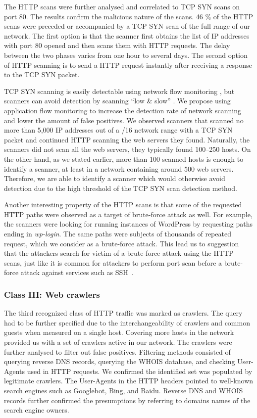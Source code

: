 The HTTP scans were further analysed and correlated to TCP SYN scans on port 80. The results confirm the malicious nature of the scans. 46 \% of the HTTP scans were preceded or accompanied by a TCP SYN scan of the full range of our network. The first option is that the scanner first obtains the list of IP addresses with port 80 opened and then scans them with HTTP requests. The delay between the two phases varies from one hour to several days. The second option of HTTP scanning is to send a HTTP request instantly after receiving a response to the TCP SYN packet.

TCP SYN scanning is easily detectable using network flow monitoring \cite{Sperotto-2010-Overview}, but scanners can avoid detection by scanning ``low \& slow'' \cite{Kang-2007-Distributed}. We propose using application flow monitoring to increase the detection rate of network scanning and lower the amount of false positives. We observed scanners that scanned no more than 5,000 IP addresses out of a /16 network range with a TCP SYN packet and continued HTTP scanning the web servers they found. Naturally, the scanners did not scan all the web servers, they typically found 100--250 hosts. On the other hand, as we stated earlier, more than 100 scanned hosts is enough to identify a scanner, at least in a network containing around 500 web servers. Therefore, we are able to identify a scanner which would otherwise avoid detection due to the high threshold of the TCP SYN scan detection method.

Another interesting property of the HTTP scans is that some of the requested HTTP paths were observed as a target of brute-force attack as well. For example, the scanners were looking for running instances of WordPress by requesting paths ending in \textit{wp-login}. The same paths were subjects of thousands of repeated request, which we consider as a brute-force attack. This lead us to suggestion that the attackers search for victim of a brute-force attack using the HTTP scans, just like it is common for attackers to perform port scan before a brute-force attack against services such as SSH~\cite{Vykopal-2013-Flow}.

\subsubsection{Class III: Web crawlers}

The third recognized class of HTTP traffic was marked as crawlers. The query had to be further specified due to the interchangeability of crawlers and common guests when measured on a single host. Covering more hosts in the network provided us with a set of crawlers active in our network. The crawlers were further analysed to filter out false positives. Filtering methods consisted of querying reverse DNS records, querying the WHOIS database, and checking User-Agents used in HTTP requests. We confirmed the identified set was populated by legitimate crawlers. The User-Agents in the HTTP headers pointed to well-known search engines such as Googlebot, Bing, and Baidu. Reverse DNS and WHOIS records further confirmed the presumptions by referring to domains names of the search engine owners.

